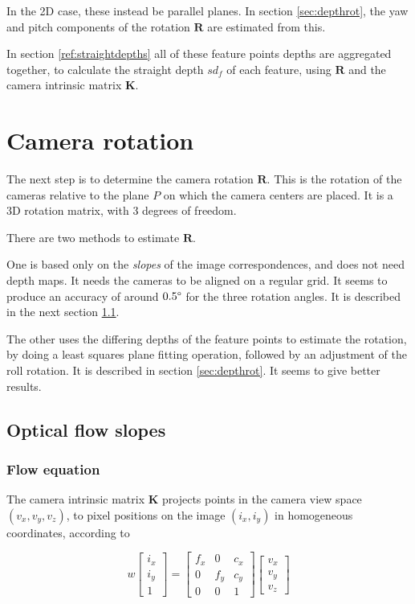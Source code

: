 \documentclass[11pt]{scrreprt}
\newcommand{\matr}[1]{\mathbf{#1}}
\newcommand{\degr}{\text{\textdegree}}
\begin{document}
In the 2D case, these instead be parallel planes. In section \ref{sec:depthrot}, the yaw and pitch components of the rotation $\matr{R}$ are estimated from this.

In section \ref{ref:straightdepths} all of these feature points depths are aggregated together, to calculate the straight depth $sd_f$ of each feature, using $\matr{R}$ and the camera intrinsic matrix $\matr{K}$.


\pagebreak
\section{Camera rotation}
\label{sec:camrotation}
The next step is to determine the camera rotation $\matr{R}$. This is the rotation of the cameras relative to the plane $P$ on which the camera centers are placed. It is a 3D rotation matrix, with 3 degrees of freedom.

There are two methods to estimate $\matr{R}$.

One is based only on the \emph{slopes} of the image correspondences, and does not need depth maps. It needs the cameras to be aligned on a regular grid. It seems to produce an accuracy of around $0.5\degr$ for the three rotation angles. It is described in the next section \ref{sec:sloperot}.

The other uses the differing depths of the feature points to estimate the rotation, by doing a least squares plane fitting operation, followed by an adjustment of the roll rotation. It is described in section \ref{sec:depthrot}. It seems to give better results.


\subsection{Optical flow slopes}
\label{sec:sloperot}

\subsubsection{Flow equation}
The camera intrinsic matrix $\matr{K}$ projects points in the camera view space $(v_x, v_y, v_z)$, to pixel positions on the image $(i_x, i_y)$ in homogeneous coordinates, according to

\begin{equation}
w \begin{bmatrix}
	i_x \\ i_y \\ 1
\end{bmatrix}
= \begin{bmatrix}
	f_x & 0 & c_x \\
	0 & f_y & c_y \\
	0 & 0 & 1
\end{bmatrix}
\begin{bmatrix}
	v_x \\ v_y \\ v_z
\end{bmatrix}
\end{equation}
\end{document}
